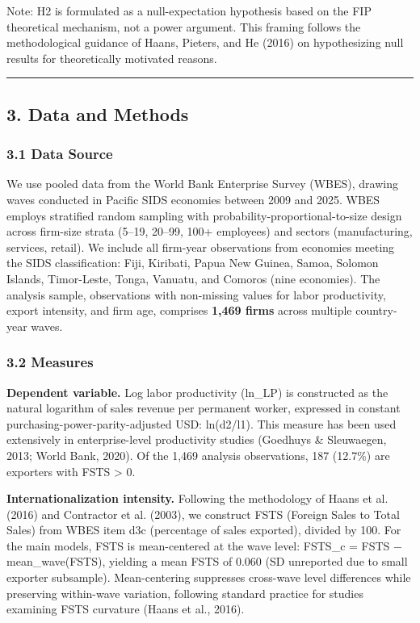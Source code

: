 \documentclass[12pt,a4paper]{article}
\begin{document}
Note: H2 is formulated as a null-expectation hypothesis based on the FIP
theoretical mechanism, not a power argument. This framing follows the
methodological guidance of Haans, Pieters, and He (2016) on
hypothesizing null results for theoretically motivated reasons.

\begin{center}\rule{0.5\linewidth}{0.5pt}\end{center}

\hypertarget{3-data-and-methods}{%
\subsection{3. Data and Methods}\label{3-data-and-methods}}

\hypertarget{31-data-source}{%
\subsubsection{3.1 Data Source}\label{31-data-source}}

We use pooled data from the World Bank Enterprise Survey (WBES), drawing
waves conducted in Pacific SIDS economies between 2009 and 2025. WBES
employs stratified random sampling with probability-proportional-to-size
design across firm-size strata (5--19, 20--99, 100+ employees) and
sectors (manufacturing, services, retail). We include all firm-year
observations from economies meeting the SIDS classification: Fiji,
Kiribati, Papua New Guinea, Samoa, Solomon Islands, Timor-Leste, Tonga,
Vanuatu, and Comoros (nine economies). The analysis sample, observations
with non-missing values for labor productivity, export intensity, and
firm age, comprises \textbf{1,469 firms} across multiple country-year
waves.

\hypertarget{32-measures}{%
\subsubsection{3.2 Measures}\label{32-measures}}

\textbf{Dependent variable.} Log labor productivity (ln\_LP) is
constructed as the natural logarithm of sales revenue per permanent
worker, expressed in constant purchasing-power-parity-adjusted USD:
ln(d2/l1). This measure has been used extensively in enterprise-level
productivity studies (Goedhuys \& Sleuwaegen, 2013; World Bank, 2020).
Of the 1,469 analysis observations, 187 (12.7\%) are exporters with FSTS
\textgreater{} 0.

\textbf{Internationalization intensity.} Following the methodology of
Haans et al. (2016) and Contractor et al. (2003), we construct FSTS
(Foreign Sales to Total Sales) from WBES item d3c (percentage of sales
exported), divided by 100. For the main models, FSTS is mean-centered at
the wave level: FSTS\_c = FSTS − mean\_wave(FSTS), yielding a mean FSTS
of 0.060 (SD unreported due to small exporter subsample). Mean-centering
suppresses cross-wave level differences while preserving within-wave
variation, following standard practice for studies examining FSTS
curvature (Haans et al., 2016).
\end{document}
